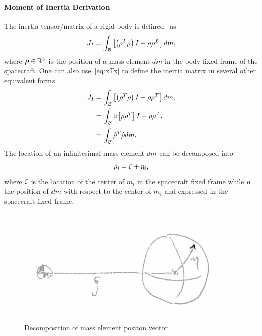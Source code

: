 \paragraph{Moment of Inertia Derivation}\label{sec:moment_of_inertia}
The inertia tensor/matrix of a rigid body is defined~\cite{greenwood1988} as
\begin{align}\label{eq:moi_definition}
    J_I = \int_{\mathcal{B}} \left[  \left( \rho_{}^T \rho_{}  \right)I - \rho_{}\rho_{}^T \right] dm, 
\end{align}
where \( \bm{\rho} \in \mathbb{R}^3 \) is the position of a mass element \( dm \) in the body fixed frame of the spacecraft.
One can also use~\cref{eq:xTx} to define the inertia matrix in several other equivalent forms
\begin{align*}
    J_I &= \int_{\mathcal{B}} \left[  \left( \rho^T \rho  \right)I - \rho\rho^T \right] dm, \\
        &= \int_{\mathcal{B}} \mathrm{tr}\negthickspace\left[ \rho\rho^T \right] I - \rho\rho^T, \\
        &= \int_{\mathcal{B}} \hat{\rho}^T \hat{\rho} dm.
\end{align*}
The location of an infinitesimal mass element \( dm \) can be decomposed into
\begin{align}\label{eq:mass_element_position}
    \rho_i = \zeta + \eta_i, 
\end{align}
where \( \zeta \) is the location of the center of \( m_i \) in the spacecraft fixed frame while \( \eta \) the position of \( dm \) with respect to the center of \( m_i \) and expressed in the spacecraft fixed frame.
\begin{figure}[htbp]
    \centering
    \includegraphics[width=\textwidth]{figures/dumbbell_pos_vector.png}
    \caption{Decomposition of mass element positon vector}
    \label{fig:dumbbell_moi_mass_element_position}
\end{figure}

